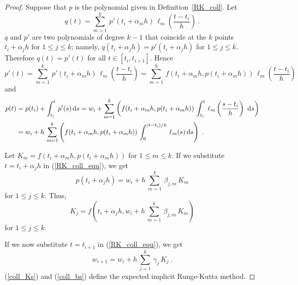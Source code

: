 \begin{proof}
Suppose that $p$ is the polynomial given in Definition~\ref{RK_coll}.
Let
\[
  q(t) = \sum_{m=1}^k\,p'(t_i+\alpha_m h)\,
  \ell_m\left( \frac{t-t_i}{h}\right) \ .
\]
$q$ and $p'$ are two polynomials of degree $k-1$ that coincide
at the $k$ points $t_i+\alpha_j h$ for $1 \leq j \leq k$; namely,
$q(t_i+\alpha_j h) = p'(t_i+\alpha_j h)$ for $1 \leq j \leq k$.
Therefore $q(t) = p'(t)$ for all $t \in [t_i, t_{i+1}]$.  Hence
\[
p'(t) = \sum_{m=1}^k\,p'(t_i+\alpha_m h)\,\ell_m\left( \frac{t-t_i}{h}\right)
= \sum_{m=1}^k\,f(t_i+\alpha_m h,p(t_i+\alpha_m h))\,
\ell_m\left(\frac{t-t_i}{h} \right)
\]
and
\begin{align}
p(t) &= p(t_i) + \int_{t_i}^t\,p'(s)\,\mathrm{d}s
= w_i + \sum_{m=1}^k\left( f(t_i+\alpha_m h,p(t_i+\alpha_m h))\,
\int_{t_i}^t\,\ell_m\left(\frac{s-t_i}{h}\right)\,\,\mathrm{d}s \right)
\nonumber \\
&= w_i + h\,\sum_{m=1}^k\left( f(t_i+\alpha_m h,p(t_i+\alpha_m h))\,
\int_{0}^{(t-t_i)/h}\,\ell_m(s)\,\mathrm{d}s \right) \ . \label{RK_coll_equ}
\end{align}

Let $K_m = f(t_i+\alpha_m h,p(t_i+\alpha_m h))$ for $1 \leq m \leq k$.
If we substitute $t=t_i+\alpha_j h$ in (\ref{RK_coll_equ}), we get
\begin{equation}\label{polColRK}
p(t_i+\alpha_jh) = w_i + h\,\sum_{m=1}^k\, \beta_{j,m}\,K_m
\end{equation}
for $1 \leq j \leq k$.   Thus,
\begin{equation} \label{coll_Ks}
  K_j = f\left(t_i+\alpha_j h, w_i + h\,\sum_{m=1}^k\, \beta_{j,m}\,K_m\right)
\end{equation}
for $1 \leq j \leq k$.

If we now substitute $t=t_{i+1}$ in (\ref{RK_coll_equ}), we get
\begin{equation} \label{coll_bs}
w_{i+1} = w_i + h\,\sum_{j=1}^k\, \gamma_j\,K_j \ .
\end{equation}
(\ref{coll_Ks}) and (\ref{coll_bs}) define the expected implicit
Runge-Kutta method.
\end{proof}

